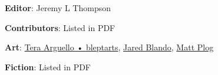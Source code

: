 \begin{description}

\item {\bfseries Editor}: Jeremy L Thompson

\item {\bfseries Contributors}: Listed in PDF

\item {\bfseries Art}: \href{https://ko-fi.com/bleptarts}{Tera Arguello • bleptarts}, \href{https://jaredblando.com/}{Jared Blando}, \href{https://www.deviantart.com/mattplog}{Matt Plog}

\item {\bfseries Fiction}: Listed in PDF

\end{description}
